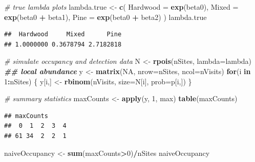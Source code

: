 \documentclass[
]{article}
\newenvironment{Shaded}{\begin{snugshade}}{\end{snugshade}}
\newcommand{\AttributeTok}[1]{\textcolor[rgb]{0.13,0.29,0.53}{#1}}
\newcommand{\CommentTok}[1]{\textcolor[rgb]{0.56,0.35,0.01}{\textit{#1}}}
\newcommand{\ConstantTok}[1]{\textcolor[rgb]{0.56,0.35,0.01}{#1}}
\newcommand{\ControlFlowTok}[1]{\textcolor[rgb]{0.13,0.29,0.53}{\textbf{#1}}}
\newcommand{\DecValTok}[1]{\textcolor[rgb]{0.00,0.00,0.81}{#1}}
\newcommand{\DocumentationTok}[1]{\textcolor[rgb]{0.56,0.35,0.01}{\textbf{\textit{#1}}}}
\newcommand{\FunctionTok}[1]{\textcolor[rgb]{0.13,0.29,0.53}{\textbf{#1}}}
\newcommand{\NormalTok}[1]{#1}
\newcommand{\OtherTok}[1]{\textcolor[rgb]{0.56,0.35,0.01}{#1}}
\newcommand{\SpecialCharTok}[1]{\textcolor[rgb]{0.81,0.36,0.00}{\textbf{#1}}}
\begin{document}
\begin{Shaded}
\begin{Highlighting}[]
\CommentTok{\# true lambda plots}
\NormalTok{lambda.true }\OtherTok{\textless{}{-}} \FunctionTok{c}\NormalTok{(}
  \AttributeTok{Hardwood =} \FunctionTok{exp}\NormalTok{(beta0),}
  \AttributeTok{Mixed =} \FunctionTok{exp}\NormalTok{(beta0 }\SpecialCharTok{+}\NormalTok{ beta1),}
  \AttributeTok{Pine =} \FunctionTok{exp}\NormalTok{(beta0 }\SpecialCharTok{+}\NormalTok{ beta2)}
\NormalTok{)}
\NormalTok{lambda.true}
\end{Highlighting}
\end{Shaded}

\begin{verbatim}
##  Hardwood     Mixed      Pine 
## 1.0000000 0.3678794 2.7182818
\end{verbatim}

\begin{Shaded}
\begin{Highlighting}[]
\CommentTok{\# simulate occupancy and detection data}
\NormalTok{N }\OtherTok{\textless{}{-}} \FunctionTok{rpois}\NormalTok{(nSites, }\AttributeTok{lambda=}\NormalTok{lambda)         }\DocumentationTok{\#\# local abundance }
\NormalTok{y }\OtherTok{\textless{}{-}} \FunctionTok{matrix}\NormalTok{(}\ConstantTok{NA}\NormalTok{, }\AttributeTok{nrow=}\NormalTok{nSites, }\AttributeTok{ncol=}\NormalTok{nVisits)}
\ControlFlowTok{for}\NormalTok{(i }\ControlFlowTok{in} \DecValTok{1}\SpecialCharTok{:}\NormalTok{nSites) \{}
\NormalTok{    y[i,] }\OtherTok{\textless{}{-}} \FunctionTok{rbinom}\NormalTok{(nVisits, }\AttributeTok{size=}\NormalTok{N[i], }\AttributeTok{prob=}\NormalTok{p[i,])}
\NormalTok{\}}

\CommentTok{\# summary statistics}
\NormalTok{maxCounts }\OtherTok{\textless{}{-}} \FunctionTok{apply}\NormalTok{(y, }\DecValTok{1}\NormalTok{, max) }
\FunctionTok{table}\NormalTok{(maxCounts)            }
\end{Highlighting}
\end{Shaded}

\begin{verbatim}
## maxCounts
##  0  1  2  3  4 
## 61 34  2  2  1
\end{verbatim}

\begin{Shaded}
\begin{Highlighting}[]
\NormalTok{naiveOccupancy }\OtherTok{\textless{}{-}} \FunctionTok{sum}\NormalTok{(maxCounts}\SpecialCharTok{\textgreater{}}\DecValTok{0}\NormalTok{)}\SpecialCharTok{/}\NormalTok{nSites}
\NormalTok{naiveOccupancy }
\end{Highlighting}
\end{Shaded}
\end{document}
